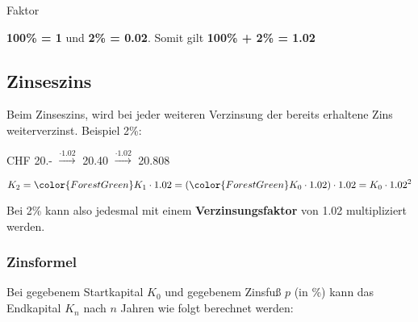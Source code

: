 \begin{bemerkung}{Faktor}{}

\textbf{100\% = 1} und  \textbf{2\% = 0.02}. Somit gilt \textbf{100\% + 2\% = 1.02}

\end{bemerkung}
\newpage



\subsection{Zinseszins}


Beim Zinseszins, wird bei jeder weiteren Verzinsung der bereits
erhaltene Zins weiterverzinst. Beispiel 2\%:

CHF 20.- $\stackrel{\cdot{}1.02}{\longrightarrow}$ 20.40 $\stackrel{\cdot{}1.02}{\longrightarrow}$ 20.808

$$K_2 = {\color{ForestGreen}K_1}\cdot{}1.02 = ({\color{ForestGreen}K_0\cdot{}1.02})\cdot{}1.02 = K_0\cdot{}1.02^2$$

Bei 2\% kann also jedesmal mit einem \textbf{Verzinsungsfaktor} von
1.02 multipliziert werden.




\subsubsection{Zinsformel}

Bei gegebenem Startkapital $K_0$ und gegebenem Zinsfuß $p$ (in \%) kann das Endkapital $K_n$ nach $n$ Jahren wie folgt berechnet werden:


